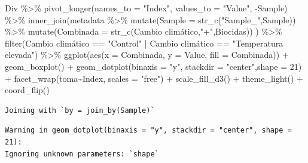 \documentclass[
  letterpaper,
  DIV=11,
  numbers=noendperiod]{scrartcl}
\newenvironment{Shaded}{\begin{snugshade}}{\end{snugshade}}
\newcommand{\AttributeTok}[1]{\textcolor[rgb]{0.40,0.45,0.13}{#1}}
\newcommand{\DecValTok}[1]{\textcolor[rgb]{0.68,0.00,0.00}{#1}}
\newcommand{\FunctionTok}[1]{\textcolor[rgb]{0.28,0.35,0.67}{#1}}
\newcommand{\NormalTok}[1]{\textcolor[rgb]{0.00,0.23,0.31}{#1}}
\newcommand{\SpecialCharTok}[1]{\textcolor[rgb]{0.37,0.37,0.37}{#1}}
\newcommand{\StringTok}[1]{\textcolor[rgb]{0.13,0.47,0.30}{#1}}
\begin{document}
\begin{Shaded}
\begin{Highlighting}[]
\NormalTok{Div }\SpecialCharTok{\%\textgreater{}\%} 
  \FunctionTok{pivot\_longer}\NormalTok{(}\AttributeTok{names\_to =} \StringTok{"Index"}\NormalTok{, }\AttributeTok{values\_to =} \StringTok{"Value"}\NormalTok{, }\SpecialCharTok{{-}}\NormalTok{Sample) }\SpecialCharTok{\%\textgreater{}\%} 
  \FunctionTok{inner\_join}\NormalTok{(metadata }\SpecialCharTok{\%\textgreater{}\%} 
               \FunctionTok{mutate}\NormalTok{(}\AttributeTok{Sample =} \FunctionTok{str\_c}\NormalTok{(}\StringTok{"Sample\_"}\NormalTok{,Sample)) }\SpecialCharTok{\%\textgreater{}\%} 
               \FunctionTok{mutate}\NormalTok{(}\AttributeTok{Combinada =} \FunctionTok{str\_c}\NormalTok{(}\StringTok{\textasciigrave{}}\AttributeTok{Cambio climático}\StringTok{\textasciigrave{}}\NormalTok{,}\StringTok{"+"}\NormalTok{,Biocidas))}
\NormalTok{             ) }\SpecialCharTok{\%\textgreater{}\%} 
  \FunctionTok{filter}\NormalTok{(}\StringTok{\textasciigrave{}}\AttributeTok{Cambio climático}\StringTok{\textasciigrave{}} \SpecialCharTok{==} \StringTok{"Control"} \SpecialCharTok{|} \StringTok{\textasciigrave{}}\AttributeTok{Cambio climático}\StringTok{\textasciigrave{}} \SpecialCharTok{==} \StringTok{"Temperatura elevada"}\NormalTok{) }\SpecialCharTok{\%\textgreater{}\%} 
  \FunctionTok{ggplot}\NormalTok{(}\FunctionTok{aes}\NormalTok{(}\AttributeTok{x =}\NormalTok{ Combinada, }\AttributeTok{y =}\NormalTok{ Value, }\AttributeTok{fill =}\NormalTok{ Combinada)) }\SpecialCharTok{+} 
  \FunctionTok{geom\_boxplot}\NormalTok{() }\SpecialCharTok{+} 
  \FunctionTok{geom\_dotplot}\NormalTok{(}\AttributeTok{binaxis =} \StringTok{"y"}\NormalTok{, }\AttributeTok{stackdir =} \StringTok{"center"}\NormalTok{,}\AttributeTok{shape =} \DecValTok{21}\NormalTok{) }\SpecialCharTok{+}
  \FunctionTok{facet\_wrap}\NormalTok{(toma}\SpecialCharTok{\textasciitilde{}}\NormalTok{Index, }\AttributeTok{scales =} \StringTok{"free"}\NormalTok{) }\SpecialCharTok{+}
  \FunctionTok{scale\_fill\_d3}\NormalTok{() }\SpecialCharTok{+} 
  \FunctionTok{theme\_light}\NormalTok{() }\SpecialCharTok{+} \FunctionTok{coord\_flip}\NormalTok{()}
\end{Highlighting}
\end{Shaded}

\begin{verbatim}
Joining with `by = join_by(Sample)`
\end{verbatim}

\begin{verbatim}
Warning in geom_dotplot(binaxis = "y", stackdir = "center", shape = 21):
Ignoring unknown parameters: `shape`
\end{verbatim}
\end{document}
